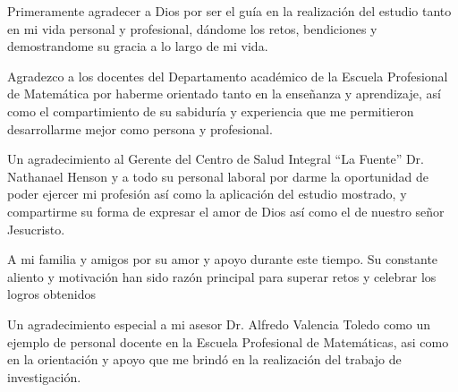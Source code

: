 \begin{agradecimiento}

Primeramente agradecer a Dios por ser el guía en la realización del estudio tanto en mi vida personal y profesional, dándome los retos, bendiciones y demostrandome su gracia a lo largo de mi vida.

Agradezco a los docentes del Departamento académico de la Escuela Profesional de Matemática por haberme orientado tanto en la enseñanza y aprendizaje, así como el compartimiento de su sabiduría y experiencia que me permitieron desarrollarme mejor como persona y profesional.

Un agradecimiento al Gerente del Centro de Salud Integral ``La Fuente'' Dr. Nathanael Henson y a todo su personal laboral por darme la oportunidad de poder ejercer mi profesión así como la aplicación del estudio mostrado, y compartirme su forma de expresar el amor de Dios así como el de nuestro señor Jesucristo. 

A mi familia y amigos por su amor y apoyo durante este tiempo. Su constante aliento y motivación han sido razón principal para superar retos y celebrar los logros obtenidos

Un agradecimiento especial a mi asesor Dr. Alfredo Valencia Toledo como un ejemplo de personal docente en la Escuela Profesional de Matemáticas, asi como en la orientación y apoyo que me brindó en la realización del trabajo de investigación.


\end{agradecimiento}
